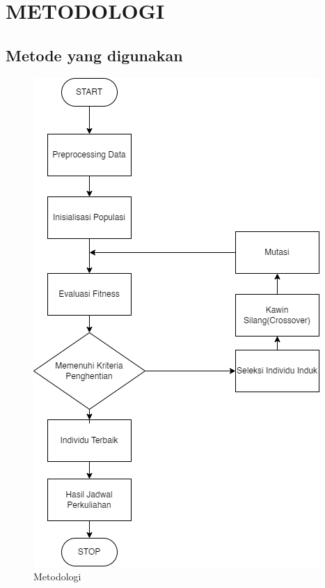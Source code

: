   \chapter{METODOLOGI}


\section{Metode yang digunakan}

\begin{figure} [ht] \centering
  \includegraphics[scale=0.45]{gambar/Algoritma.png}
  \caption{Metodologi}
  \label{fig:Blueprint}
\end{figure}

